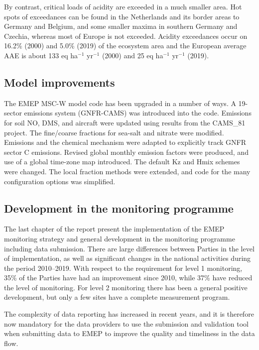 By contrast, critical loads of acidity are exceeded in a much smaller area. Hot spots of
exceedances can be found in the Netherlands and its border areas to Germany and
Belgium, and some smaller maxima in southern Germany and Czechia, whereas most of Europe is not exceeded.
Acidity exceedances occur
on 16.2\% (2000) and 5.0\% (2019) of the ecosystem area and the European average
AAE is about 133 eq ha$^{-1}$ yr$^{-1}$ (2000) and 25 eq ha$^{-1}$ yr$^{-1}$ (2019).









\subsection*{Model improvements} %

The EMEP MSC-W model code has been upgraded in a number of ways. 
A 19-sector emissions system (GNFR-CAMS) was introduced into the code. Emissions for soil NO, DMS, and aircraft were updated using results from the CAMS\_81 project. 
The  fine/coarse fractions for sea-salt and nitrate were modified. Emissions and the chemical mechanism were adapted to explicitly track GNFR sector C emissions. Revised global monthly emission factors were produced, and use of a global time-zone map introduced. The default Kz and Hmix schemes were changed. The local fraction methods were extended, and code for the many configuration options was simplified. 




\subsection*{Development in the monitoring programme} %
The last chapter of the report present the implementation of the EMEP monitoring strategy and general development in the monitoring programme including data submission. There are large differences between Parties in the level of implementation, as well as significant changes in the national activities during the period 2010--2019. With respect to the requirement for level 1 monitoring, 35\% of the Parties have had an improvement since 2010, while 37\% have reduced the level of monitoring. For level 2 monitoring there has been a general positive development, but only a few sites have a complete measurement program.

The complexity of data reporting has increased in recent years, and it is therefore now mandatory for the data providers to use the submission and validation tool when submitting data to EMEP to improve the quality and timeliness in the data flow.


